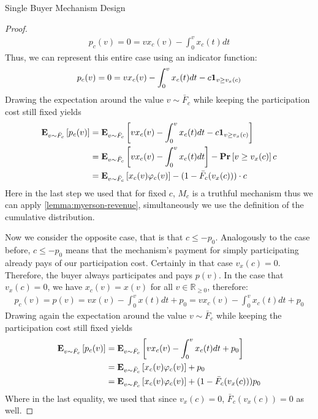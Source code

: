 \documentclass[11pt,a4paper]{article}
\newcommand{\RR}{\ensuremath{\mathbb{R}}}
\renewcommand{\Pr}[1]{\mbox{\rm\bf Pr}\left[#1\right]}
\newcommand{\Ex}[2][]{\mbox{\rm\bf E}_{#1}\left[#2\right]}
\newcommand{\1}[1]{\mbox{\rm\bf 1}_{#1}}
\begin{document}
\begin{section}{Single Buyer Mechanism Design}
\begin{proof}
     \begin{align*}
         p_c(v) = 0 = v x_c(v) - \int_0^v x_c(t) dt
     \end{align*}
     Thus, we can represent this entire case using an indicator function:
     \begin{align*}
         p_c(v) = 0 = v x_c(v) - \int_0^v x_c(t) dt - c \1{v \geq v_x(c)}
     \end{align*}
     Drawing the expectation around the value $v \sim \bar{F}_c$ while keeping the participation cost still fixed yields
     \begin{equation}
         \label{eq:expected-revenue-first-case}
         \begin{aligned}
             \Ex[v \sim \bar{F}_c]{p_c(v)} & = \Ex[v \sim \bar{F}_c]{v x_c(v) - \int_0^v x_c(t) dt - c \1{v \geq v_x(c)}}   \\
                                           & = \Ex[v \sim \bar{F}_c]{v x_c(v) - \int_0^v x_c(t) dt} - \Pr{v \geq v_x(c)}c   \\
                                           & = \Ex[v \sim \bar{F}_c]{x_c(v) \varphi_c(v)} - (1 - \bar{F}_c(v_x(c))) \cdot c \\
         \end{aligned}
     \end{equation}
     Here in the last step we used that for fixed $c$, $M_c$ is a truthful mechanism thus we can apply \autoref{lemma:myerson-revenue}, simultaneously we use the definition of the cumulative distribution.

     Now we consider the opposite case, that is that $c \leq -p_0$.
     Analogously to the case before, $c \leq -p_0$ means that the mechanism's payment for simply participating already pays of our participation cost.
     Certainly in that case $v_x(c) = 0$.
     Therefore, the buyer always participates and pays $p(v)$. In the case that $v_x(c) = 0$, we have $x_c(v) = x(v)$ for all $v \in \RR_{\geq 0}$, therefore:
     \begin{align*}
         p_c(v) = p(v) = v x(v) - \int_0^v x(t)dt + p_0 = v x_c(v) - \int_0^v x_c(t)dt + p_0
     \end{align*}
     Drawing again the expectation around the value $v \sim \bar{F}_c$ while keeping the participation cost still fixed yields
     \begin{equation}
         \label{eq:expected-revenue-second-case}
         \begin{aligned}
             \Ex[v \sim \bar{F}_c]{p_c(v)} & = \Ex[v \sim \bar{F}_c]{v x_c(v) - \int_0^v x_c(t)dt + p_0}                  \\
                                           & = \Ex[v \sim \bar{F}_c]{x_c(v) \varphi_c(v)} + p_0                           \\
                                           & = \Ex[v \sim \bar{F}_c]{x_c(v) \varphi_c(v)} + (1 - \bar{F}_{c}(v_x(c))) p_0
         \end{aligned}
     \end{equation}
     Where in the last equality, we used that since $v_x(c) = 0$, $\bar{F}_{c}(v_x(c)) = 0$ as well.


\end{proof}
\end{section}
\end{document}
